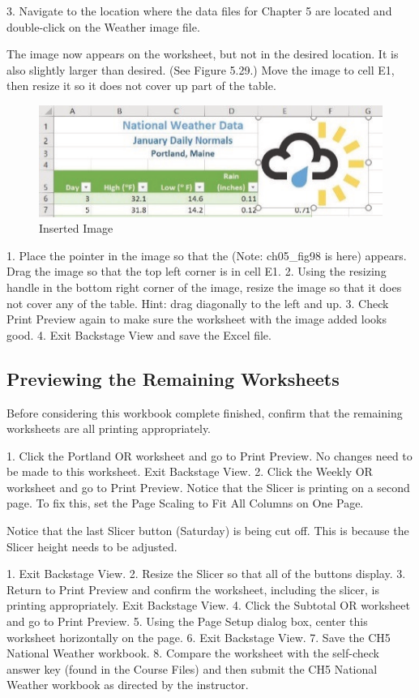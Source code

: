 3. Navigate to the location where the data files for Chapter 5 are located and double-click on the Weather image file.

The image now appears on the worksheet, but not in the desired location. It is also slightly larger than desired. (See Figure 5.29.) Move the image to cell E1, then resize it so it does not cover up part of the table.

\begin{figure}[H]
	\centering
	\includegraphics[width=\maxwidth{.95\linewidth}]{gfx/ch05_fig29}
	\caption{Inserted Image}
	\label{05:fig29}
\end{figure}

1. Place the pointer in the image so that the  (Note: ch05\_fig98 is here)   appears. Drag the image so that the top left corner is in cell E1.
2. Using the resizing handle in the bottom right corner of the image, resize the image so that it
does not cover any of the table. Hint: drag diagonally to the left and up.
3. Check Print Preview again to make sure the worksheet with the image added looks good.
4. Exit Backstage View and save the Excel file.

\subsection{Previewing the Remaining Worksheets}

Before considering this workbook complete finished, confirm that the remaining worksheets are all printing appropriately.

1. Click the Portland OR worksheet and go to Print Preview. No changes need to be made to this
worksheet. Exit Backstage View.
2. Click the Weekly OR worksheet and go to Print Preview. Notice that the Slicer is printing on a
second page. To fix this, set the Page Scaling to Fit All Columns on One Page.

Notice that the last Slicer button (Saturday) is being cut off. This is because the Slicer height needs to
be adjusted.

1. Exit Backstage View.
2. Resize the Slicer so that all of the buttons display.
3. Return to Print Preview and confirm the worksheet, including the slicer, is printing
appropriately. Exit Backstage View.
4. Click the Subtotal OR worksheet and go to Print Preview.
5. Using the Page Setup dialog box, center this worksheet horizontally on the page.
6. Exit Backstage View.
7. Save the CH5 National Weather workbook.
8. Compare the worksheet with the self-check answer key (found in the Course Files) and then submit the CH5 National Weather workbook as directed by the instructor.


